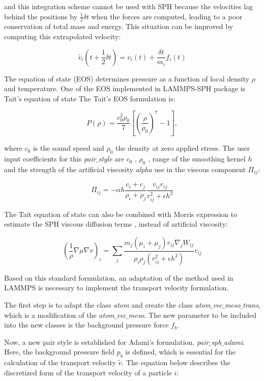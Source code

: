 and this integration scheme cannot be used with SPH because the velocities lag behind the positions by $\frac{1}{2}\delta t$ when the forces are computed, leading to a poor conservation
of total mass and energy. This situation can be improved by computing this extrapolated velocity:
  
\begin{equation}
\tilde {v_{i}}(t+\frac{1}{2}\delta t) = v_{i}(t) + \frac{\delta t}{m_{i}} f_{i}(t)
\end{equation}

The equation of state (EOS) determines pressure as a function of local density $\rho$ and temperature. One of the EOS implemented in LAMMPS-SPH package is Tait's equation of state
The Tait's EOS formulation is:

  
\begin{equation}
P(\rho) = \frac{c_{0}^2 \rho_{0}}{7}\left[\left(\frac{\rho}{\rho_{0}}\right)^7 - 1 \right] , 
\end{equation}

where $c_{0}$ is the sound speed and $\rho_{0}$ the density at zero applied stress. The user input coefficients for this \textit{pair$\_$style} are $c_{0}$ , $\rho_{0}$ , range of the
smoothing  kernel $h$ and the strength of the artificial viscosity \textit{alpha} use in the viscous component $\Pi_{ij}$:

\begin{equation}
\Pi_{ij} = -\alpha h \frac{c_{i}+c_{j}}{\rho_{i}+\rho_{j}} \frac{v_{ij}r_{ij}}{r^2_{ij}+\epsilon h^2}
\end{equation}

The Tait equation of state can also be combined with Morris expression to estimate the SPH viscous diffusion terms \cite{morris_switch_1997}, instead of artificial viscosity:

\begin{equation}
\left(\frac{1}{\rho}\nabla  \mu \nabla v \right)_{i} = \sum_{j} \frac{m_{j}(\mu_{i}+\mu_{j})r_{ij}\nabla_{j}W_{ij}}{\rho_{i}\rho_{j}(r^2_{ij}+\epsilon h^2)} v_{ij}
\end{equation}

Based on this standard formulation, an adaptation of the method used in LAMMPS is necessary to implement the transport velocity formulation.\par

The first step is to adapt the class \textit{atom} and create the class \textit{atom$\_$vec$\_$meso$\_$trans}, which is a modification of the \textit{atom$\_$vec$\_$meso}. The new 
parameter to be included into the new classes is the background pressure force $f_{b}$. \par
Now, a new pair style is established for Adami's formulation, \textit{pair$\_$sph$\_$adami}. Here, the background pressure field $p_{b}$ is defined, which is essential for the calculation
of the transport velocity $\tilde{v}$. The equation below describes the discretized form of the transport velocity of a particle $i$:

